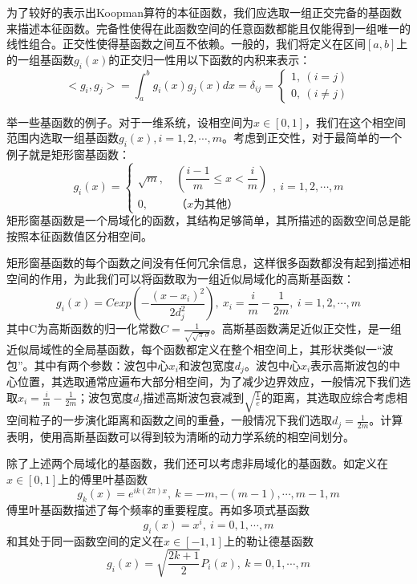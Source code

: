 为了较好的表示出Koopman算符的本征函数，我们应选取一组正交完备的基函数来描述本征函数。完备性使得在此函数空间的任意函数都能且仅能得到一组唯一的线性组合。正交性使得基函数之间互不依赖。一般的，我们将定义在区间$[a,b]$上的一组基函数${g_i(x)}$的正交归一性用以下函数的内积来表示：
\begin{equation}
    <g_i,g_j>=\int_a^b{g_i(x)g_j(x)}dx=\delta_{ij}=
    \begin{cases}
        1,\ (i=j)\\
        0,\ (i\neq j)
    \end{cases}
\end{equation}

举一些基函数的例子。对于一维系统，设相空间为$x\in [0,1]$，我们在这个相空间范围内选取一组基函数${g_i(x)},i=1,2,\cdots,m$。考虑到正交性，对于最简单的一个例子就是矩形窗基函数：
\begin{equation}
    g_i(x)=
    \begin{cases}
        \sqrt{m},\ &(\dfrac{i-1}{m}\leq x<\dfrac{i}{m})\\
        0,\ &（x为其他）
    \end{cases},\ i=1,2,\cdots,m
\end{equation}
矩形窗基函数是一个局域化的函数，其结构足够简单，其所描述的函数空间总是能按照本征函数值区分相空间。

矩形窗基函数的每个函数之间没有任何冗余信息，这样很多函数都没有起到描述相空间的作用，为此我们可以将函数取为一组近似局域化的高斯基函数：
\begin{equation}
    g_i(x)=Cexp\left(-\dfrac{(x-x_i)^2}{2d_j^2}\right), \ x_i=\frac{i}{m}-\frac{1}{2m},\ i=1,2,\cdots,m
\end{equation}
其中C为高斯函数的归一化常数$C=\frac{1}{\sqrt{\sqrt{\pi}\sigma}}$。高斯基函数满足近似正交性，是一组近似局域性的全局基函数，每个函数都定义在整个相空间上，其形状类似一“波包”。其中有两个参数：波包中心$x_i$和波包宽度$d_j$。波包中心$x_i$表示高斯波包的中心位置，其选取通常应遍布大部分相空间，为了减少边界效应，一般情况下我们选取$x_i=\frac{i}{m}-\frac{1}{2m}$；波包宽度$d_j$描述高斯波包衰减到$\sqrt{\frac{1}{e}}$的距离，其选取应综合考虑相空间粒子的一步演化距离和函数之间的重叠，一般情况下我们选取$d_j=\frac{1}{2m}$。计算表明，使用高斯基函数可以得到较为清晰的动力学系统的相空间划分。

除了上述两个局域化的基函数，我们还可以考虑非局域化的基函数。如定义在$x\in [0,1]$上的傅里叶基函数
\begin{equation}
    g_k(x)=e^{ik(2\pi)x},\ k=-m,-(m-1),\cdots,m-1,m
\end{equation}
傅里叶基函数描述了每个频率的重要程度。再如多项式基函数
\begin{equation}
    g_i(x)=x^i,\ i=0,1,\cdots,m
\end{equation}
和其处于同一函数空间的定义在$x\in [-1,1]$上的勒让德基函数
\begin{equation}
    g_i(x)=\sqrt{\dfrac{2k+1}{2}}P_i(x),\ k=0,1,\cdots,m
\end{equation}

